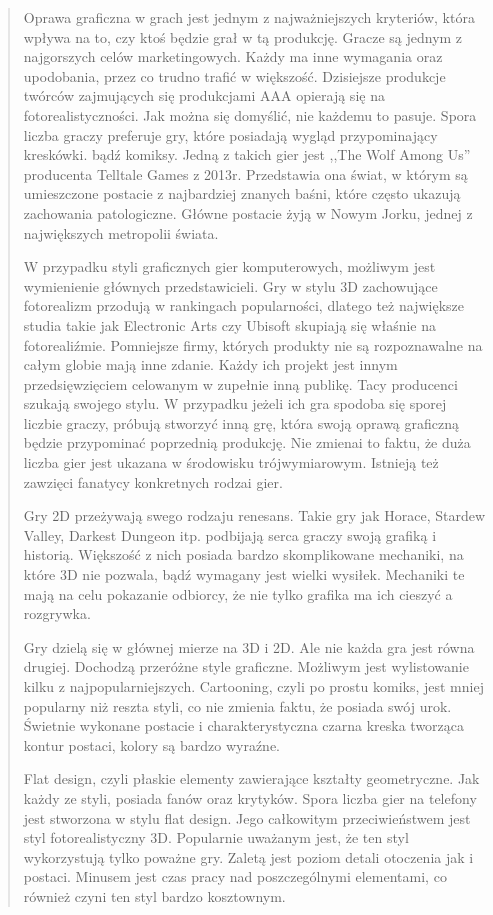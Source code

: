 \begin{quotation}
\indent Oprawa graficzna w grach jest jednym z najważniejszych kryteriów, która wpływa na to, czy ktoś będzie grał w tą produkcję. Gracze są jednym z najgorszych celów marketingowych. Każdy ma inne wymagania oraz upodobania, przez co trudno trafić w większość. Dzisiejsze produkcje twórców zajmujących się produkcjami AAA opierają się na fotorealistyczności. Jak można się domyślić, nie każdemu to pasuje. Spora liczba graczy preferuje gry, które posiadają wygląd przypominający kreskówki. bądź komiksy. Jedną z takich gier jest ,,The Wolf Among Us'' producenta Telltale Games z 2013r. Przedstawia ona świat, w którym są umieszczone postacie z najbardziej znanych baśni, które często ukazują zachowania patologiczne. Główne postacie żyją w Nowym Jorku, jednej z największych metropolii świata.

\indent W przypadku styli graficznych gier komputerowych, możliwym jest wymienienie głównych przedstawicieli. Gry w stylu 3D zachowujące fotorealizm przodują w rankingach popularności, dlatego też największe studia takie jak Electronic Arts czy Ubisoft skupiają się właśnie na fotorealiźmie. Pomniejsze firmy, których produkty nie są rozpoznawalne na całym globie mają inne zdanie. Każdy ich projekt jest innym przedsięwzięciem celowanym w zupełnie inną publikę. Tacy producenci szukają swojego stylu. W przypadku jeżeli ich gra spodoba się sporej liczbie graczy, próbują stworzyć inną grę, która swoją oprawą graficzną będzie przypominać poprzednią produkcję. Nie zmienai to faktu, że duża liczba gier jest ukazana w środowisku trójwymiarowym. Istnieją też zawzięci fanatycy konkretnych rodzai gier.

\indent Gry 2D przeżywają swego rodzaju renesans. Takie gry jak Horace, Stardew Valley, Darkest Dungeon itp. podbijają serca graczy swoją grafiką i historią. Większość z nich posiada bardzo skomplikowane mechaniki, na które 3D nie pozwala, bądź wymagany jest wielki wysiłek. Mechaniki te mają na celu pokazanie odbiorcy, że nie tylko grafika ma ich cieszyć a rozgrywka.

\indent Gry dzielą się w głównej mierze na 3D i 2D. Ale nie każda gra jest równa drugiej. Dochodzą przeróżne style graficzne. Możliwym jest wylistowanie kilku z najpopularniejszych. Cartooning, czyli po prostu komiks, jest mniej popularny niż reszta styli, co nie zmienia faktu, że posiada swój urok. Świetnie wykonane postacie i charakterystyczna czarna kreska tworząca kontur postaci, kolory są bardzo wyraźne.

\indent Flat design, czyli płaskie elementy zawierające kształty geometryczne. Jak każdy ze styli, posiada fanów oraz krytyków. Spora liczba gier na telefony jest stworzona w stylu flat design. Jego całkowitym przeciwieństwem jest styl fotorealistyczny 3D. Popularnie uważanym jest, że ten styl wykorzystują tylko poważne gry. Zaletą jest poziom detali otoczenia jak i postaci. Minusem jest czas pracy nad poszczególnymi elementami, co również czyni ten styl bardzo kosztownym.


\end{quotation}
